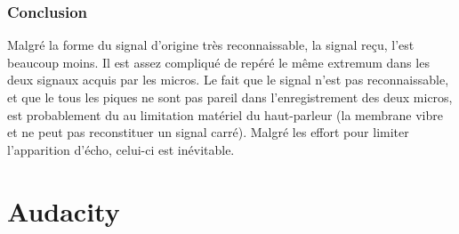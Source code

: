 \documentclass[12pt,a4paper]{report}
\begin{document}
\subsection{Conclusion}
Malgré la forme du signal d'origine très reconnaissable, la signal reçu, l'est beaucoup moins. Il est assez compliqué de repéré le même extremum dans les deux signaux acquis par les micros. Le fait que le signal n'est pas reconnaissable, et que le tous les piques ne sont pas pareil dans l'enregistrement des deux micros, est probablement du au limitation matériel du haut-parleur (la membrane vibre et ne peut pas reconstituer un signal carré). Malgré les effort pour limiter l'apparition d'écho, celui-ci est inévitable.
	
	
\appendix
\chapter{Audacity}
\end{document}
